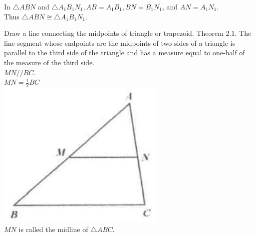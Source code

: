 \documentclass{article}
\begin{document}
In \(\triangle A B N\) and \(\triangle A_{1} B_{1} N_{1}, A B=A_{1} B_{1}, B N=B_{1} N_{1}\), and \(A N=A_{1} N_{1}\).\\
Thus \(\triangle A B N \cong \triangle A_{1} B_{1} N_{1}\).

Draw a line connecting the midpoints of triangle or trapezoid.
Theorem 2.1. The line segment whose endpoints are the midpoints of two sides of a triangle is parallel to the third side of the triangle and has a measure equal to one-half of the measure of the third side.\\
\(M N / / B C\).\\
\(M N=\frac{1}{2} B C\)\\
\centering
\includegraphics[width=\textwidth]{images/032(2).jpg}\\
\(M N\) is called the midline of \(\triangle A B C\).
\end{document}
